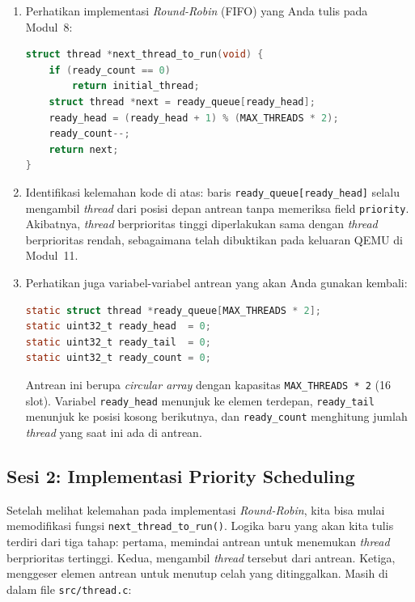 \begin{enumerate}
	\item Perhatikan implementasi \textit{Round-Robin} (FIFO) yang Anda tulis pada Modul~8:
	      \begin{lstlisting}[language=C, caption={Implementasi Round-Robin saat ini di next\_thread\_to\_run()}]
struct thread *next_thread_to_run(void) {
    if (ready_count == 0)
        return initial_thread;
    struct thread *next = ready_queue[ready_head];
    ready_head = (ready_head + 1) % (MAX_THREADS * 2);
    ready_count--;
    return next;
}
    \end{lstlisting}

	\item Identifikasi kelemahan kode di atas: baris \texttt{ready\_queue[ready\_head]} selalu mengambil \textit{thread} dari posisi depan antrean tanpa memeriksa field \texttt{priority}. Akibatnya, \textit{thread} berprioritas tinggi diperlakukan sama dengan \textit{thread} berprioritas rendah, sebagaimana telah dibuktikan pada keluaran QEMU di Modul~11.

	\item Perhatikan juga variabel-variabel antrean yang akan Anda gunakan kembali:
	      \begin{lstlisting}[language=C, caption={Variabel antrean thread di thread.c (sudah disediakan)}]
static struct thread *ready_queue[MAX_THREADS * 2];
static uint32_t ready_head  = 0;
static uint32_t ready_tail  = 0;
static uint32_t ready_count = 0;
    \end{lstlisting}
	      Antrean ini berupa \textit{circular array} dengan kapasitas \texttt{MAX\_THREADS * 2} (16 slot). Variabel \texttt{ready\_head} menunjuk ke elemen terdepan, \texttt{ready\_tail} menunjuk ke posisi kosong berikutnya, dan \texttt{ready\_count} menghitung jumlah \textit{thread} yang saat ini ada di antrean.
\end{enumerate}

\subsection{Sesi 2: Implementasi Priority Scheduling}
\label{sec:m12-sesi-2}

Setelah melihat kelemahan pada implementasi \textit{Round-Robin}, kita bisa mulai memodifikasi fungsi \texttt{next\_thread\_to\_run()}. Logika baru yang akan kita tulis terdiri dari tiga tahap: pertama, memindai antrean untuk menemukan \textit{thread} berprioritas tertinggi. Kedua, mengambil \textit{thread} tersebut dari antrean. Ketiga, menggeser elemen antrean untuk menutup celah yang ditinggalkan. Masih di dalam file \texttt{src/thread.c}:

